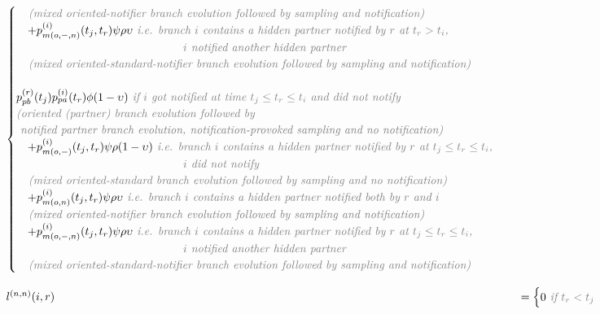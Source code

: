 \documentclass[a4paper,10pt]{article}
\begin{document}
\begin{equation}
\begin{array}{ll}
\begin{cases}
 \textit{\color{gray} ~~~(mixed oriented-notifier branch evolution followed by sampling and notification)}
\\
~~~+p_{m(o,-,n)}^{(i)}(t_j,t_r)\psi\rho\upsilon  \textit{\color{gray} ~i.e. branch $i$ contains a hidden partner notified by $r$ at $t_r > t_i$, }\\
\textit{\color{gray} ~~~~~~~~~~~~~~~~~~~~~~~~~~~~~~~~~~~~~~~~~$i$ notified another hidden partner}\\
 \textit{\color{gray} ~~~(mixed oriented-standard-notifier branch evolution followed by sampling and notification)}
\\
\\
p_{pb}^{(r)}(t_j) p_{pa}^{(i)}(t_r) \phi (1-\upsilon) \textit{\color{gray} ~if $i$ got notified at time $t_j \leq t_r \leq t_i$ and did not notify}\\
\textit{\color{gray} (oriented (partner) branch evolution followed by} \\
\textit{\color{gray}~notified partner branch evolution, notification-provoked sampling and no notification)}
\\
~~~+p_{m(o,-)}^{(i)}(t_j,t_r)\psi\rho(1-\upsilon) \textit{\color{gray} ~i.e. branch $i$ contains a hidden partner notified by $r$ at $t_j \leq t_r \leq t_i$, }\\
\textit{\color{gray} ~~~~~~~~~~~~~~~~~~~~~~~~~~~~~~~~~~~~~~~~~$i$  did not notify}\\
 \textit{\color{gray} ~~~(mixed oriented-standard branch evolution followed by sampling and no notification)}\\
 ~~~+p_{m(o,n)}^{(i)}(t_j,t_r)\psi\rho\upsilon \textit{\color{gray} ~i.e. branch $i$ contains a hidden partner notified both by $r$ and $i$}\\
 \textit{\color{gray} ~~~(mixed oriented-notifier branch evolution followed by sampling and notification)}
\\
~~~+p_{m(o,-,n)}^{(i)}(t_j,t_r)\psi\rho\upsilon  \textit{\color{gray} ~i.e. branch $i$ contains a hidden partner notified by $r$ at $t_j \leq t_r \leq t_i$, }\\
\textit{\color{gray} ~~~~~~~~~~~~~~~~~~~~~~~~~~~~~~~~~~~~~~~~~$i$ notified another hidden partner}\\
 \textit{\color{gray} ~~~(mixed oriented-standard-notifier branch evolution followed by sampling and notification)}
\end{cases}\\
\\
l^{(n,n)}(i,r) &= \begin{cases}0 \textit{\color{gray} ~if $t_r < t_j$}\\

\end{cases}
\end{array}
\end{equation}
\end{document}
